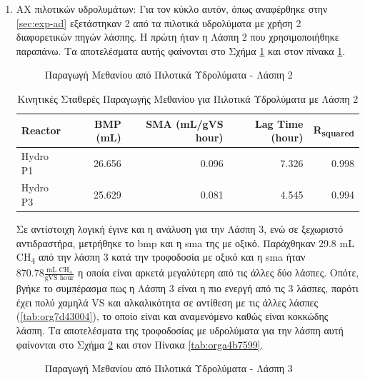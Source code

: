 \documentclass[11pt]{report}
\begin{document}
\begin{enumerate}
\pagebreak

\item AX πιλοτικών υδρολυμάτων:
\label{sec:org0dff69b}
Για τον κύκλο αυτόν, όπως αναφέρθηκε στην \autoref{sec:exp-ad} εξετάστηκαν 2 από τα πιλοτικά υδρολύματα με χρήση 2 διαφορετικών πηγών λάσπης. Η πρώτη ήταν η Λάσπη 2 που χρησιμοποιήθηκε παραπάνω. Τα αποτελέσματα αυτής φαίνονται στο Σχήμα \ref{fig:orga787183} και στον πίνακα \ref{tab:orgb5dec09}.

\begin{figure}[htbp]
\centering

\caption{\label{fig:orga787183}Παραγωγή Μεθανίου από Πιλοτικά Υδρολύματα - Λάσπη 2}
\end{figure}

\begin{table}[htbp]
\caption{\label{tab:orgb5dec09}Κινητικές Σταθερές Παραγωγής Μεθανίου για Πιλοτικά Υδρολύματα με Λάσπη 2}
\centering
\begin{tabular}{lrrrr}
Reactor & BMP (mL) & SMA (mL/gVS hour) & Lag Time (hour) & R\textsubscript{squared}\\[0pt]
\hline
Hydro P1 & 26.656 & 0.096 & 7.326 & 0.998\\[0pt]
Hydro P3 & 25.629 & 0.081 & 4.545 & 0.994\\[0pt]
\end{tabular}
\end{table}

Σε αντίστοιχη λογική έγινε και η ανάλυση για την Λάσπη 3, ενώ σε ξεχωριστό αντιδραστήρα, μετρήθηκε το \acrshort{bmp} και η \acrshort{sma} της με οξικό. Παράχθηκαν 29.8 mL CH\textsubscript{4} από την λάσπη 3 κατά την τροφοδοσία με οξικό και η \acrshort{sma} ήταν \(870.78 \frac{\text{mL CH$_4$}}{\text{gVS hour}}\) η οποία είναι αρκετά μεγαλύτερη από τις άλλες δύο λάσπες. Οπότε, βγήκε το συμπέρασμα πως η Λάσπη 3 είναι η πιο ενεργή από τις 3 λάσπες, παρότι έχει πολύ χαμηλά VS και αλκαλικότητα σε αντίθεση με τις άλλες λάσπες (\ref{tab:org7d43004}), το οποίο είναι και αναμενόμενο καθώς είναι κοκκώδης λάσπη. Τα αποτελέσματα της τροφοδοσίας με υδρολύματα για την λάσπη αυτή φαίνονται στο Σχήμα \ref{fig:orgd5f1520} και στον Πίνακα \ref{tab:orga4b7599}.

\begin{figure}[htbp]
\centering

\caption{\label{fig:orgd5f1520}Παραγωγή Μεθανίου από Πιλοτικά Υδρολύματα - Λάσπη 3}
\end{figure}


\end{enumerate}
\end{document}
